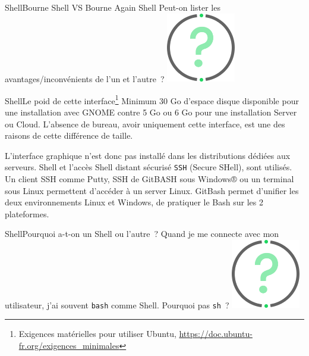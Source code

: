 \documentclass{beamer}
\begin{document}
    \begin{frame}{Shell}{Bourne Shell VS Bourne Again Shell}
        Peut-on lister les avantages/inconvénients de l'un et l'autre~?
        \bigbreak
        \centering
        \includegraphics[width=3cm]{image/question-mark}
    \end{frame}

    \begin{frame}{Shell}{Le poid de cette interface\footnote{Exigences matérielles pour utiliser Ubuntu, \url{https://doc.ubuntu-fr.org/exigences_minimales}}}
        Minimum 30 Go d'espace disque disponible pour une installation avec GNOME contre 5 Go ou 6 Go pour une installation Server ou Cloud.
        \bigbreak
        L'absence de bureau, avoir uniquement cette interface, est une des raisons de cette différence de taille.

        L'interface graphique n'est donc pas installé dans les distributions dédiées aux serveurs.
        Shell et l'accès Shell distant sécurisé \lstinline{SSH} (Secure SHell), sont utilisés.
        Un client SSH comme Putty, SSH de GitBASH sous Windows® ou un terminal sous Linux permettent d'accéder à un server Linux.
        \bigbreak
        GitBash permet d'unifier les deux environnements Linux et Windows, de pratiquer le Bash sur les 2 plateformes.
    \end{frame}

    \begin{frame}{Shell}{Pourquoi a-t-on un Shell ou l'autre~?}
        Quand je me connecte avec mon utilisateur, j'ai souvent \lstinline{bash} comme Shell.
        Pourquoi pas \lstinline{sh}~?
        \bigbreak
        \centering
        \includegraphics[width=3cm]{image/question-mark}
    \end{frame}
\end{document}
